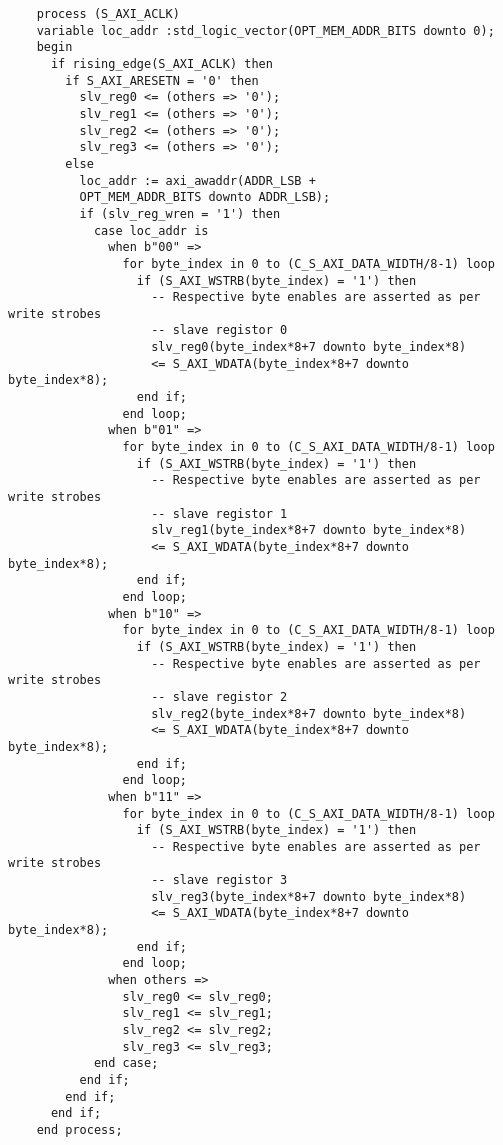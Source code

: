 \begin{lstlisting}
	process (S_AXI_ACLK)
	variable loc_addr :std_logic_vector(OPT_MEM_ADDR_BITS downto 0); 
	begin
	  if rising_edge(S_AXI_ACLK) then 
	    if S_AXI_ARESETN = '0' then
	      slv_reg0 <= (others => '0');
	      slv_reg1 <= (others => '0');
	      slv_reg2 <= (others => '0');
	      slv_reg3 <= (others => '0');
	    else
	      loc_addr := axi_awaddr(ADDR_LSB +
          OPT_MEM_ADDR_BITS downto ADDR_LSB);
	      if (slv_reg_wren = '1') then
	        case loc_addr is
	          when b"00" =>
	            for byte_index in 0 to (C_S_AXI_DATA_WIDTH/8-1) loop
	              if (S_AXI_WSTRB(byte_index) = '1') then
	                -- Respective byte enables are asserted as per write strobes                   
	                -- slave registor 0
	                slv_reg0(byte_index*8+7 downto byte_index*8) 
                    <= S_AXI_WDATA(byte_index*8+7 downto byte_index*8);
	              end if;
	            end loop;
	          when b"01" =>
	            for byte_index in 0 to (C_S_AXI_DATA_WIDTH/8-1) loop
	              if (S_AXI_WSTRB(byte_index) = '1') then
	                -- Respective byte enables are asserted as per write strobes                   
	                -- slave registor 1
	                slv_reg1(byte_index*8+7 downto byte_index*8)
                    <= S_AXI_WDATA(byte_index*8+7 downto byte_index*8);
	              end if;
	            end loop;
	          when b"10" =>
	            for byte_index in 0 to (C_S_AXI_DATA_WIDTH/8-1) loop
	              if (S_AXI_WSTRB(byte_index) = '1') then
	                -- Respective byte enables are asserted as per write strobes                   
	                -- slave registor 2
	                slv_reg2(byte_index*8+7 downto byte_index*8) 
                    <= S_AXI_WDATA(byte_index*8+7 downto byte_index*8);
	              end if;
	            end loop;
	          when b"11" =>
	            for byte_index in 0 to (C_S_AXI_DATA_WIDTH/8-1) loop
	              if (S_AXI_WSTRB(byte_index) = '1') then
	                -- Respective byte enables are asserted as per write strobes                   
	                -- slave registor 3
	                slv_reg3(byte_index*8+7 downto byte_index*8) 
                    <= S_AXI_WDATA(byte_index*8+7 downto byte_index*8);
	              end if;
	            end loop;
	          when others =>
	            slv_reg0 <= slv_reg0;
	            slv_reg1 <= slv_reg1;
	            slv_reg2 <= slv_reg2;
	            slv_reg3 <= slv_reg3;
	        end case;
	      end if;
	    end if;
	  end if;                   
	end process; 


\end{lstlisting}
